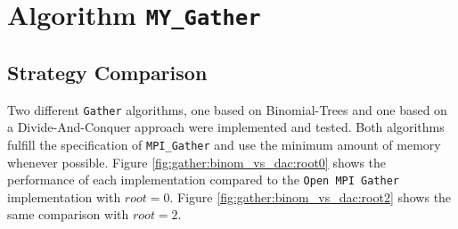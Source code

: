 
\newcommand\mygather{\texttt{MY\_Gather}\xspace}
\newcommand\myscatter{\texttt{MY\_Scatter}\xspace}

\newcommand\mpigather{\texttt{MPI\_Gather}\xspace}
\newcommand\mpiscatter{\texttt{MPI\_Scatter}\xspace}

\section{Algorithm \mygather}

\subsection{Strategy Comparison}

Two different \texttt{Gather} algorithms, one based on Binomial-Trees and one based on a Divide-And-Conquer approach were implemented and tested. Both algorithms fulfill the specification of \mpigather and use the minimum amount of memory whenever possible. Figure \ref{fig:gather:binom_vs_dac:root0} shows the performance of each implementation compared to the \texttt{Open MPI Gather} implementation with $root = 0$. Figure \ref{fig:gather:binom_vs_dac:root2} shows the same comparison with $root = 2$.

